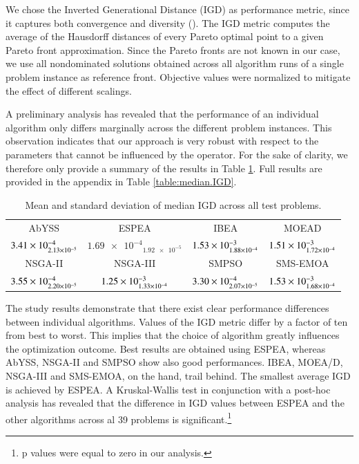 We chose the Inverted Generational Distance (IGD) as performance metric, since it captures both convergence and diversity (\cite{van1998evolutionary}). The IGD metric computes the average of the Hausdorff distances of every Pareto optimal point to a given Pareto front approximation. Since the Pareto fronts are not known in our case, we use all nondominated solutions obtained across all algorithm runs of a single problem instance as reference front. Objective values were normalized to mitigate the effect of different scalings.

A preliminary analysis has revealed that the performance of an individual algorithm only differs marginally across the different problem instances. This observation indicates that our approach is very robust with respect to the parameters that cannot be influenced by the operator. For the sake of clarity, we therefore only provide a summary of the results in Table \ref{tbl:summary}. Full results are provided in the appendix in Table \ref{table:median.IGD}.

\begin{table}
\caption{Mean and standard deviation of median IGD across all test problems.}
\label{tbl:summary}
\centering
\begin{tabular}{*{4}{c}} \toprule
AbYSS & ESPEA & IBEA & MOEAD\\ \cmidrule(lr){1-1} \cmidrule(lr){2-2} \cmidrule(lr){3-3} \cmidrule(lr){4-4}
$\num{3.41E-4}_{\num{2.13E-5}}$ & $\num{1.69e-4}_{\num{1.92e-5}}$ & $\num{1.53E-3}_{\num{1.88E-4}}$ & $\num{1.51E-3}_{\num{1.72E-4}}$ \\ \midrule
NSGA-II & NSGA-III & SMPSO & SMS-EMOA \\ \cmidrule(lr){1-1} \cmidrule(lr){2-2} \cmidrule(lr){3-3} \cmidrule(lr){4-4}
$\num{3.55E-4}_{\num{2.20E-5}}$ & $\num{1.25E-3}_{\num{1.33E-4}}$ & $\num{3.30E-4}_{\num{2.07E-5}}$ & $\num{1.53E-3}_{\num{1.68E-4}}$ \\
\bottomrule
\end{tabular}
\end{table}

The study results demonstrate that there exist clear performance differences between individual algorithms. Values of the IGD metric differ by a factor of ten from best to worst. This implies that the choice of algorithm greatly influences the optimization outcome. Best results are obtained using ESPEA, whereas AbYSS, NSGA-II and SMPSO show also good performances. IBEA, MOEA/D, NSGA-III and SMS-EMOA, on the hand, trail behind. The smallest average IGD is achieved by ESPEA. A Kruskal-Wallis test in conjunction with a post-hoc analysis has revealed that the difference in IGD values between ESPEA and the other algorithms across al 39 problems is significant.\footnote{p values were equal to zero in our analysis.}

